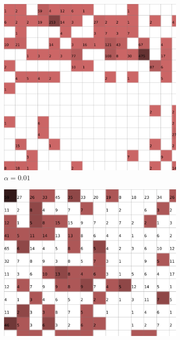 \documentclass{acm_proc_article-sp}
\begin{document}
\begin{figure}
\centering
    \centering
    \begin{subfigure}[b]{0.24\linewidth}
        \includegraphics[width=\linewidth]{img/wine-20x16-topographic-error-alpha-0,01}
        \caption{$\alpha=0.01$}
        \label{fig:wine-20x16-topographic-error-alpha-0,01}
    \end{subfigure}
    \begin{subfigure}[b]{0.24\linewidth}
        \includegraphics[width=\linewidth]{img/wine-20x16-topographic-error-alpha-0,45}

\end{subfigure}
\end{figure}
\end{document}
